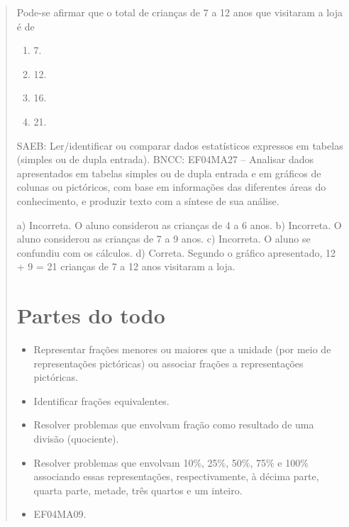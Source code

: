\begin{mdframed}[linewidth=2pt,linecolor=salmao,roundcorner=2pt]
\begin{itemize}
{\begin{itemize}
\begin{escolha}
{\begin{quote}
{\begin{escolha}
{{{Pode-se afirmar que o total de crianças
de 7 a 12 anos que visitaram a loja é de

\begin{enumerate}
\item
  7.
\item
  12.
\item
  16.
\item
  21.
\end{enumerate}

SAEB: Ler/identificar ou comparar dados estatísticos expressos em tabelas (simples ou de dupla entrada).
BNCC: EF04MA27 -- Analisar dados apresentados em tabelas simples ou de dupla entrada e em gráficos de
colunas ou pictóricos, com base em informações das diferentes áreas do conhecimento, e produzir
texto com a síntese de sua análise.

a)  Incorreta. O aluno considerou as crianças de 4 a 6 anos.
b)  Incorreta. O aluno considerou as crianças de 7 a 9 anos.
c)  Incorreta. O aluno se confundiu com os cálculos.
d)  Correta. Segundo o gráfico apresentado, 12 + 9 = 21 crianças de 7 a 12 anos visitaram a loja.


\chapter{Partes do todo}


\begin{itemize}
\item Representar frações menores ou maiores que a unidade (por meio de
representações pictóricas) ou associar frações a representações pictóricas.
\item Identificar frações equivalentes.
\item Resolver problemas que envolvam fração como resultado de uma divisão
(quociente).
\item Resolver problemas que envolvam 10\%, 25\%, 50\%, 75\% e 100\%
associando essas representações, respectivamente, à décima parte, quarta parte, metade,
três quartos e um inteiro.
\end{itemize}


\begin{itemize}
\item EF04MA09.
\end{itemize}


}}}
\end{escolha}}
\end{quote}}
\end{escolha}
\end{itemize}}
\end{itemize}
\end{mdframed}
